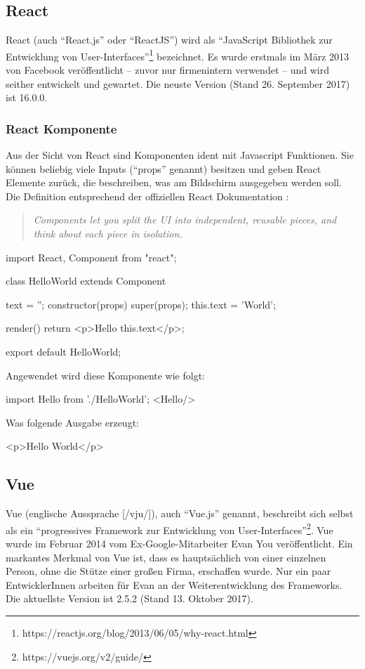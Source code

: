 \subsection{React}
React (auch "`React.js"' oder "`ReactJS"') wird als "`JavaScript Bibliothek zur Entwicklung von User-Interfaces"'\footnote{https://reactjs.org/blog/2013/06/05/why-react.html} bezeichnet. Es wurde erstmals im März 2013 von Facebook veröffentlicht -- zuvor nur firmenintern verwendet -- und wird seither entwickelt und gewartet. Die neuste Version (Stand 26. September 2017) ist 16.0.0.

\subsubsection{React Komponente}
Aus der Sicht von React sind Komponenten ident mit Javascript Funktionen. Sie können beliebig viele Inputs ("`props"' genannt) besitzen und geben React Elemente zurück, die beschreiben, was am Bildschirm ausgegeben werden soll.
Die Definition entsprechend der offiziellen React Dokumentation \cite{react-component}: 
\begin{quote}
	\begin{english}
		\textit{Components let you split the UI into independent, reusable pieces, and think about each piece in isolation.}
	\end{english}
\end{quote}

\begin{JsCode}
	import React, {Component} from "react";
	
	class HelloWorld extends Component {
		text = '';
		constructor(props) {
			super(props);
			this.text = 'World';
		}
		
		render() {
			return <p>Hello {this.text}</p>;
		}
	}
	export default HelloWorld;
\end{JsCode}
Angewendet wird diese Komponente wie folgt:
\begin{JsCode}[numbers=none]
	import Hello from './HelloWorld';
	<Hello/>
\end{JsCode}
Was folgende Ausgabe erzeugt:
\begin{JsCode}Hello World</p>
\end{JsCode}

\subsection{Vue }
Vue (englische Aussprache [/vju/]), auch "`Vue.js"' genannt, beschreibt sich selbst als ein "`progressives Framework zur Entwicklung von User-Interfaces"'\footnote{https://vuejs.org/v2/guide/}. Vue wurde im Februar 2014 vom Ex-Google-Mitarbeiter Evan You veröffentlicht. Ein markantes Merkmal von Vue ist, dass es hauptsächlich von einer einzelnen Person, ohne die Stütze einer großen Firma, erschaffen wurde. Nur ein paar EntwicklerInnen arbeiten für Evan an der Weiterentwicklung des Frameworks. Die aktuellste Version ist 2.5.2 (Stand 13. Oktober 2017).


